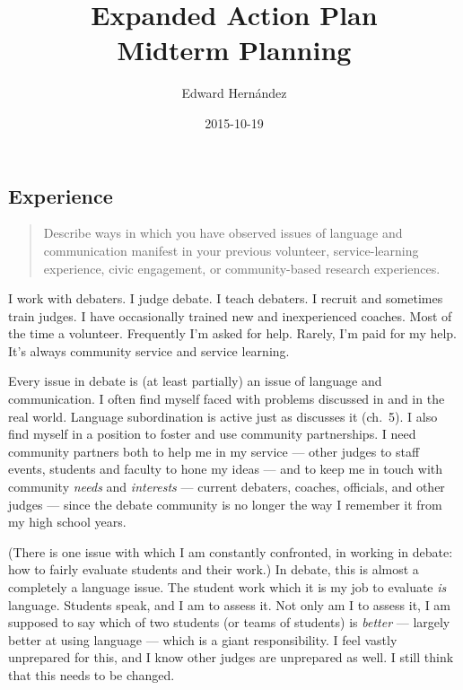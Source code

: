 \documentclass[doc,12pt]{apa6}
\begin{document}
\title{Expanded Action Plan \\ Midterm Planning}
\author{Edward Hern\'{a}ndez}
\date{2015-10-19}
\maketitle


\subsection{Experience}\label{experience}

\begin{quote}
Describe ways in which you have observed issues of language and
communication manifest in your previous volunteer, service-learning
experience, civic engagement, or community-based research experiences.
\end{quote}

{I work with debaters. I judge debate. I teach debaters. I recruit and
sometimes train judges. I have occasionally trained new and
inexperienced coaches. Most of the time a volunteer. Frequently I'm
asked for help. Rarely, I'm paid for my help. It's always community
service and service learning.

Every issue in debate is (at least partially) an issue of language and
communication. I often find myself faced with problems discussed in
 and  in the real world. Language
subordination is active just as  discusses it
(ch.~5). I also find myself in a position to foster and use
community partnerships. I need community partners both to help me in my
service --- other judges to staff events, students and faculty to hone
my ideas --- and to keep me in touch with community \emph{needs} and
\emph{interests} \cite[ch.~2]{Cress13} --- current debaters, coaches,
officials, and other judges --- since the debate community is no longer
the way I remember it from my high school years.

(There is one issue with which I am constantly confronted, in working in
debate: how to fairly evaluate students and their work.) In debate, this
is almost a completely a language issue. The student work which it is my
job to evaluate \emph{is} language. Students speak, and I am to assess
it. Not only am I to assess it, I am supposed to say which of two
students (or teams of students) is \emph{better} --- largely better at
using language --- which is a giant responsibility. I feel vastly
unprepared for this, and I know other judges are unprepared as well. I
still think that this needs to be changed.}
\end{document}
